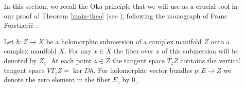 \documentclass[10pt]{amsart}
\theoremstyle{remark}
\newtheorem{defi}[theo]{Definition}
\begin{document}

In this section, we recall the Oka principle that we will use as a crucial tool in our proof of Theorem \ref{main-theo} (see \cite{For1, Gro}), following the monograph of Franc Forstneri{\v c} \cite{For2}. 

Let $h\colon Z \to X$ be a holomorphic submersion of a complex manifold $Z$ onto a complex manifold $X$. For any $x\in X$ the fiber over $x$ of this submersion will be denoted by $Z_x$. At each point $z\in Z$ the tangent space $T_zZ$ contains the vertical tangent space $VT_zZ=\ker Dh$. For holomorphic vector bundles $p\colon E \to Z$ we denote the zero element in the fiber $E_z$ by $0_z$.


\end{document}
